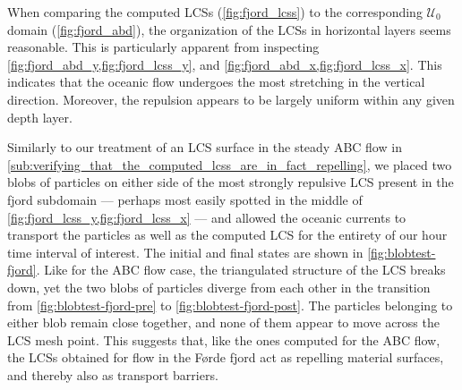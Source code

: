 



When comparing the computed LCSs (\cref{fig:fjord_lcss}) to the corresponding
$\mathcal{U}_{0}$ domain (\cref{fig:fjord_abd}), the organization of
the LCSs in horizontal layers seems reasonable. This is particularly apparent
from inspecting \cref{fig:fjord_abd_y,fig:fjord_lcss_y}, and
\cref{fig:fjord_abd_x,fig:fjord_lcss_x}. This indicates that the oceanic
flow undergoes the most stretching in the vertical direction. Moreover, the
repulsion appears to be largely uniform within any given depth layer.

Similarly to our treatment of an LCS surface in the steady ABC flow in
\cref{sub:verifying_that_the_computed_lcss_are_in_fact_repelling}, we placed
two blobs of particles on either side of the most strongly repulsive LCS
present in the fjord subdomain --- perhaps most easily spotted in the middle
of \cref{fig:fjord_lcss_y,fig:fjord_lcss_x} --- and allowed the oceanic
currents to transport the particles as well as the computed LCS for the
entirety of our  hour time interval of interest. The initial and
final states are shown in \cref{fig:blobtest-fjord}. Like for the ABC flow
case, the triangulated structure of the LCS breaks down, yet the two blobs of
particles diverge from each other in the transition from
\cref{fig:blobtest-fjord-pre} to \cref{fig:blobtest-fjord-post}. The particles
belonging to either blob remain close together, and none of them appear to
move across the LCS mesh point. This suggests that, like the ones computed
for the ABC flow, the LCSs obtained for flow in the Førde fjord act as
repelling material surfaces, and thereby also as transport barriers.




